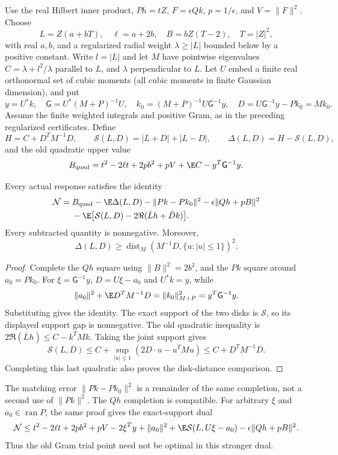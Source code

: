 Use the real Hilbert inner product, $Ph=tZ$, $F=\epsilon Qk$,
$p=1/\epsilon$, and $V=\|F\|^2$. Choose
\[
 L=Z(a+bT),\quad \ell=a+2b,\quad B=bZ(T-2),\quad T=|Z|^2,
\]
with real $a,b$, and a regularized radial weight $\lambda\ge |L|$
bounded below by a positive constant. Write $l=|L|$ and let $M$ have
pointwise eigenvalues $C=\lambda+l^2/\lambda$ parallel to $L$, and
$\lambda$ perpendicular to $L$. Let $U$ embed a finite real orthonormal
set of cubic moments (all cubic moments in finite Gaussian dimension),
and put
\[
 y=U^*k,\quad \mathsf G=U^*(M+P)^{-1}U,\quad
 k_0=(M+P)^{-1}U\mathsf G^{-1}y,
 \quad D=U\mathsf G^{-1}y-Pk_0=Mk_0.
\]
Assume the finite weighted integrals and positive Gram, as in the
preceding regularized certificates. Define
\[
 H=C+D^TM^{-1}D,\qquad
 \mathcal S(L,D)=|L+D|+|L-D|,\qquad
 \Delta(L,D)=H-\mathcal S(L,D),
\]
and the old quadratic upper value
\[
 B_{\rm quad}=t^2-2\ell t+2pb^2+pV+\E C-y^T\mathsf G^{-1}y.
\]
\begin{theorem}
\label{thm:exact-joint-response-defect}
Every actual response satisfies the identity
\begin{align}
 \mathcal N={}&B_{\rm quad}-\E\Delta(L,D)
 -\|Pk-Pk_0\|^2-\epsilon\|Qh+pB\|^2\nonumber\\
 &-\E\bigl[\mathcal S(L,D)-2\Re(\bar Lh+\bar Dk)\bigr].
 \label{eq:exact-joint-response-defect}
\end{align}
Every subtracted quantity is nonnegative. Moreover,
\[
 \Delta(L,D)\ge
 \operatorname{dist}_M(M^{-1}D,\{u:|u|\le1\})^2.
\]
\end{theorem}
\begin{proof}
Complete the $Qh$ square using $\|B\|^2=2b^2$, and the $Pk$
square around $a_0=Pk_0$. For $\xi=\mathsf G^{-1}y$,
$D=U\xi-a_0$ and $U^*k=y$, while
\[
 \|a_0\|^2+\E D^TM^{-1}D
 =\|k_0\|_{M+P}^2=y^T\mathsf G^{-1}y.
\]
Substituting gives the identity. The exact support of the two disks is
$\mathcal S$, so its displayed support gap is nonnegative.
The old quadratic inequality is
$2\Re(\bar Lh)\le C-k^TMk$.
Taking the joint support gives
\[
 \mathcal S(L,D)\le C+
 \sup_{|u|\le1}(2D\cdot u-u^TMu)
 \le C+D^TM^{-1}D.
\]
Completing this last quadratic also proves the disk-distance comparison.
\end{proof}
The matching error $\|Pk-Pk_0\|^2$ is a remainder of the same
completion, not a second use of $\|Pk\|^2$. The $Qh$ completion is
compatible. For arbitrary $\xi$ and $a_0\in\operatorname{ran}P$, the
same proof gives the exact-support dual
\[
 \mathcal N\le t^2-2\ell t+2pb^2+pV-2\xi^Ty+\|a_0\|^2
 +\E\mathcal S(L,U\xi-a_0)-\epsilon\|Qh+pB\|^2.
\]
Thus the old Gram trial point need not be optimal in this stronger dual.

